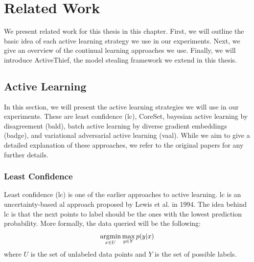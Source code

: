 
\chapter{Related Work}
\label{ch:Related_work}
We present related work for this thesis in this chapter. First, we will outline the basic idea of each active learning strategy we
use in our experiments. Next, we give an overview of the continual learning approaches we use. Finally, we will introduce ActiveThief, the
model stealing framework we extend in this thesis.


\section{Active Learning}
\label{sec:Related_work:Active_Learning}
In this section, we will present the active learning strategies we will use in our experiments. These are least confidence
(\gls{lc}), CoreSet, bayesian active learning by disagreement (\gls{bald}), batch active learning by diverse gradient embeddings (\gls{badge}), and 
variational adversarial active learning (\gls{vaal}). While we aim to give a detailed explanation of these approaches, we refer to the
original papers for any further details. \par

\subsection{Least Confidence}
\label{sec:Related_work:Active_Learning:Least_Confidence}
Least confidence (\gls{lc}) is one of the earlier approaches to active learning. \gls{lc} is an uncertainty-based \gls{al}
approach proposed by Lewis et al. \cite{lewis1995sequential} in 1994. The idea behind \gls{lc} is that the next points to label should be the 
ones with the lowest prediction probability. More formally, the data queried will be the following:
\begin{equation}
    \operatorname*{\arg\!\min}_{x \in U} \max_{y \in Y} p(y|x)
\end{equation}
where $U$ is the set of unlabeled data points and $Y$ is the set of possible labels. \par

